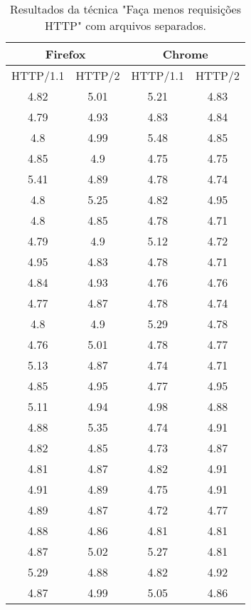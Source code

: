 \begin{table}[H]
	\centering
	\caption{Resultados da técnica "Faça menos requisições HTTP" com arquivos separados.}
	\label{resultados-facamenosrequisicoeshttp-separados}
	\begin{tabular}{cccc}
		\hline
		\multicolumn{2}{c}{\textbf{Firefox}} & \multicolumn{2}{c}{\textbf{Chrome}} \\
		\hline
		HTTP/1.1 & HTTP/2 & HTTP/1.1 & HTTP/2 \\
		\hline
		4.82 & 5.01 & 5.21 & 4.83 \\
		4.79 & 4.93 & 4.83 & 4.84 \\
		4.8  & 4.99 & 5.48 & 4.85 \\
		4.85 & 4.9  & 4.75 & 4.75 \\
		5.41 & 4.89 & 4.78 & 4.74 \\
		4.8  & 5.25 & 4.82 & 4.95 \\
		4.8  & 4.85 & 4.78 & 4.71 \\
		4.79 & 4.9  & 5.12 & 4.72 \\
		4.95 & 4.83 & 4.78 & 4.71 \\
		4.84 & 4.93 & 4.76 & 4.76 \\
		4.77 & 4.87 & 4.78 & 4.74 \\
		4.8  & 4.9  & 5.29 & 4.78 \\
		4.76 & 5.01 & 4.78 & 4.77 \\
		5.13 & 4.87 & 4.74 & 4.71 \\
		4.85 & 4.95 & 4.77 & 4.95 \\
		5.11 & 4.94 & 4.98 & 4.88 \\
		4.88 & 5.35 & 4.74 & 4.91 \\
		4.82 & 4.85 & 4.73 & 4.87 \\
		4.81 & 4.87 & 4.82 & 4.91 \\
		4.91 & 4.89 & 4.75 & 4.91 \\
		4.89 & 4.87 & 4.72 & 4.77 \\
		4.88 & 4.86 & 4.81 & 4.81 \\
		4.87 & 5.02 & 5.27 & 4.81 \\
		5.29 & 4.88 & 4.82 & 4.92 \\
		4.87 & 4.99 & 5.05 & 4.86 \\
		\hline
	\end{tabular}
\end{table}